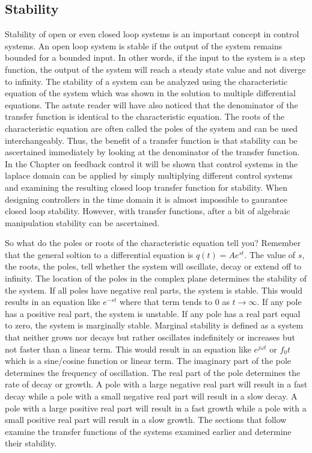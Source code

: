 \subsection{Stability}

Stability of open or even closed loop systems is an important concept in control systems. An open loop system is stable if the output of the system remains bounded for a bounded input. In other words, if the input to the system is a step function, the output of the system will reach a steady state value and not diverge to infinity. The stability of a system can be analyzed using the characteristic equation of the system which was shown in the solution to multiple differential equations. The astute reader will have also noticed that the denominator of the transfer function is identical to the characteristic equation. The roots of the characteristic equation are often called the poles of the system and can be used interchangeably. Thus, the benefit of a transfer function is that stability can be ascertained immediately by looking at the denominator of the transfer function. In the Chapter on feedback control it will be shown that control systems in the laplace domain can be applied by simply multiplying different control systems and examining the resulting closed loop transfer function for stability. When designing controllers in the time domain it is almost impossible to gaurantee closed loop stability. However, with transfer functions, after a bit of algebraic manipulation stability can be ascertained. 

So what do the poles or roots of the characteristic equation tell you? Remember that the general soltion to a differential equation is $q(t) = Ae^{st}$. The value of $s$, the roots, the poles, tell whether the system will oscillate, decay or extend off to infinity. The location of the poles in the complex plane determines the stability of the system. If all poles have negative real parts, the system is stable. This would results in an equation like $e^{-st}$ where that term tends to 0 as $t \rightarrow \infty$. If any pole has a positive real part, the system is unstable. If any pole has a real part equal to zero, the system is marginally stable. Marginal stability is defined as a system that neither grows nor decays but rather oscillates indefinitely or increases but not faster than a linear term. This would result in an equation like $e^{j\omega t}$  or $f_0 t$ which is a sine/cosine function or linear term. The imaginary part of the pole determines the frequency of oscillation. The real part of the pole determines the rate of decay or growth. A pole with a large negative real part will result in a fast decay while a pole with a small negative real part will result in a slow decay. A pole with a large positive real part will result in a fast growth while a pole with a small positive real part will result in a slow growth. The sections that follow examine the transfer functions of the systems examined earlier and determine their stability. 

